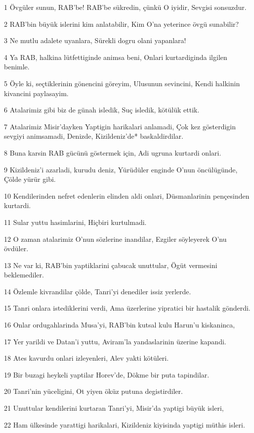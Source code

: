 \par 1 Övgüler sunun, RAB'be! RAB'be sükredin, çünkü O iyidir, Sevgisi sonsuzdur.
\par 2 RAB'bin büyük islerini kim anlatabilir, Kim O'na yeterince övgü sunabilir?
\par 3 Ne mutlu adalete uyanlara, Sürekli dogru olani yapanlara!
\par 4 Ya RAB, halkina lütfettiginde animsa beni, Onlari kurtardiginda ilgilen benimle.
\par 5 Öyle ki, seçtiklerinin gönencini göreyim, Ulusunun sevincini, Kendi halkinin kivancini paylasayim.
\par 6 Atalarimiz gibi biz de günah isledik, Suç isledik, kötülük ettik.
\par 7 Atalarimiz Misir'dayken Yaptigin harikalari anlamadi, Çok kez gösterdigin sevgiyi animsamadi, Denizde, Kizildeniz'de* baskaldirdilar.
\par 8 Buna karsin RAB gücünü göstermek için, Adi ugruna kurtardi onlari.
\par 9 Kizildeniz'i azarladi, kurudu deniz, Yürüdüler enginde O'nun öncülügünde, Çölde yürür gibi.
\par 10 Kendilerinden nefret edenlerin elinden aldi onlari, Düsmanlarinin pençesinden kurtardi.
\par 11 Sular yuttu hasimlarini, Hiçbiri kurtulmadi.
\par 12 O zaman atalarimiz O'nun sözlerine inandilar, Ezgiler söyleyerek O'nu övdüler.
\par 13 Ne var ki, RAB'bin yaptiklarini çabucak unuttular, Ögüt vermesini beklemediler.
\par 14 Özlemle kivrandilar çölde, Tanri'yi denediler issiz yerlerde.
\par 15 Tanri onlara istediklerini verdi, Ama üzerlerine yipratici bir hastalik gönderdi.
\par 16 Onlar ordugahlarinda Musa'yi, RAB'bin kutsal kulu Harun'u kiskaninca,
\par 17 Yer yarildi ve Datan'i yuttu, Aviram'la yandaslarinin üzerine kapandi.
\par 18 Ates kavurdu onlari izleyenleri, Alev yakti kötüleri.
\par 19 Bir buzagi heykeli yaptilar Horev'de, Dökme bir puta tapindilar.
\par 20 Tanri'nin yüceligini, Ot yiyen öküz putuna degistirdiler.
\par 21 Unuttular kendilerini kurtaran Tanri'yi, Misir'da yaptigi büyük isleri,
\par 22 Ham ülkesinde yarattigi harikalari, Kizildeniz kiyisinda yaptigi müthis isleri.

